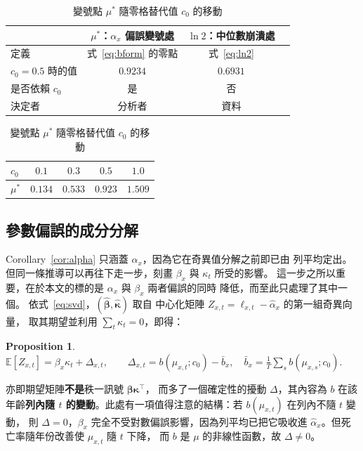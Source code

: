 \documentclass[UTF8, fontset=macnew, a4paper, 12pt]{ctexart}
\newtheorem{prop}{Proposition}
\newcommand{\Ex}{\mathbb{E}}
\begin{document}
\begin{table}[H]
\centering
\caption{兩個門檻的比較}
\small
\renewcommand{\arraystretch}{1.2}
\begin{tabular}{lccc}
\toprule
 & $\mu^{\ast}$：$\alpha_x$ 偏誤變號處 & $\ln 2$：中位數崩潰處\\
\midrule
定義            & 式~\eqref{eq:bform} 的零點 & 式~\eqref{eq:ln2}\\
$c_0=0.5$ 時的值 & $0.9234$ & $0.6931$\\
是否依賴 $c_0$   & 是       & 否\\
決定者          & 分析者   & 資料\\
\bottomrule
\end{tabular}
\label{tab:mustar}

\vspace{6pt}
\caption{變號點 $\mu^{\ast}$ 隨零格替代值 $c_0$ 的移動}
\small
\begin{tabular}{lcccc}
\toprule
$c_0$       & $0.1$ & $0.3$ & $0.5$ & $1.0$\\
\midrule
$\mu^{\ast}$ & $0.134$ & $0.533$ & $0.923$ & $1.509$\\
\bottomrule
\end{tabular}
\label{tab:c0shift}
\end{table}

\subsection{參數偏誤的成分分解}\label{sec:betadec}

Corollary~\ref{cor:alpha} 只涵蓋 $\alpha_x$，因為它在奇異值分解之前即已由
列平均定出。但同一條推導可以再往下走一步，刻畫 $\beta_x$ 與 $\kappa_t$ 所受的影響。
這一步之所以重要，在於本文的標的是 $\alpha_x$ 與 $\beta_x$ 兩者偏誤的同時
降低，而至此只處理了其中一個。
依式~\eqref{eq:svd}，$(\hat{\boldsymbol\beta},\hat{\boldsymbol\kappa})$ 取自
中心化矩陣 $Z_{x,t}=\ell_{x,t}-\hat\alpha_x$ 的第一組奇異向量，
取其期望並利用 $\sum_t\kappa_t=0$，即得：

\begin{prop}\label{prop:beta}
$\displaystyle \Ex[Z_{x,t}]=\beta_x\kappa_t+\Delta_{x,t},\qquad
\Delta_{x,t}=b(\mu_{x,t};c_0)-\bar b_x,\quad
\bar b_x=\frac1T\sum_s b(\mu_{x,s};c_0).$
\end{prop}

亦即期望矩陣\textbf{不是}秩一訊號 $\boldsymbol\beta\boldsymbol\kappa^{\top}$，
而多了一個確定性的擾動 $\Delta$，其內容為 $b$ 在該年齡\textbf{列內隨 $t$
的變動}。此處有一項值得注意的結構：若 $b(\mu_{x,t})$ 在列內不隨 $t$ 變動，
則 $\Delta=0$，$\beta_x$ 完全不受對數偏誤影響，因為列平均已把它吸收進
$\hat\alpha_x$。但死亡率隨年份改善使 $\mu_{x,t}$ 隨 $t$ 下降，
而 $b$ 是 $\mu$ 的非線性函數，故 $\Delta\ne0$。
\end{document}
